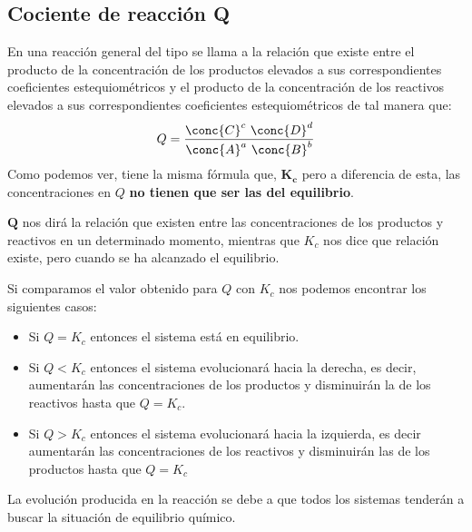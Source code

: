     \subsection{Cociente de reacción Q}

    En una reacción general del tipo 
    se llama  a la relación que existe entre el producto de la concentración de los productos elevados a sus correspondientes coeficientes estequiométricos y el producto de la concentración de los reactivos elevados a sus correspondientes coeficientes estequiométricos de tal manera que:
    \begin{equation*}
        Q = \dfrac{\conc{C}^c\ \conc{D}^d }{\conc{A}^a\ \conc{B}^b}
    \end{equation*}
    Como podemos ver, tiene la misma fórmula que, $\bm{K_c}$ pero a diferencia de esta, las concentraciones en \( Q \) \textbf{no tienen que ser las del equilibrio}.

    \(\bm{Q}\) nos dirá la relación que existen entre las concentraciones de los productos y reactivos en un determinado momento, mientras que \(K_c\) nos dice que relación existe, pero cuando se ha alcanzado el equilibrio.

    Si comparamos el valor obtenido para \(Q\) con \(K_c\) nos podemos encontrar los siguientes casos:

    \begin{itemize}
        \item Si \( Q = K_c \) entonces el sistema está en equilibrio.
        \item Si $Q < K_c$ entonces el sistema evolucionará hacia la derecha, es decir, aumentarán las concentraciones de los productos y disminuirán la de los reactivos hasta que $Q = K_c$.
        \item Si $Q > K_c$ entonces el sistema evolucionará hacia la izquierda, es decir aumentarán las concentraciones de los reactivos y disminuirán las de los productos hasta que $Q = K_c$
    \end{itemize}

    La evolución producida en la reacción se debe a que todos los sistemas tenderán a buscar la situación de equilibrio químico.

